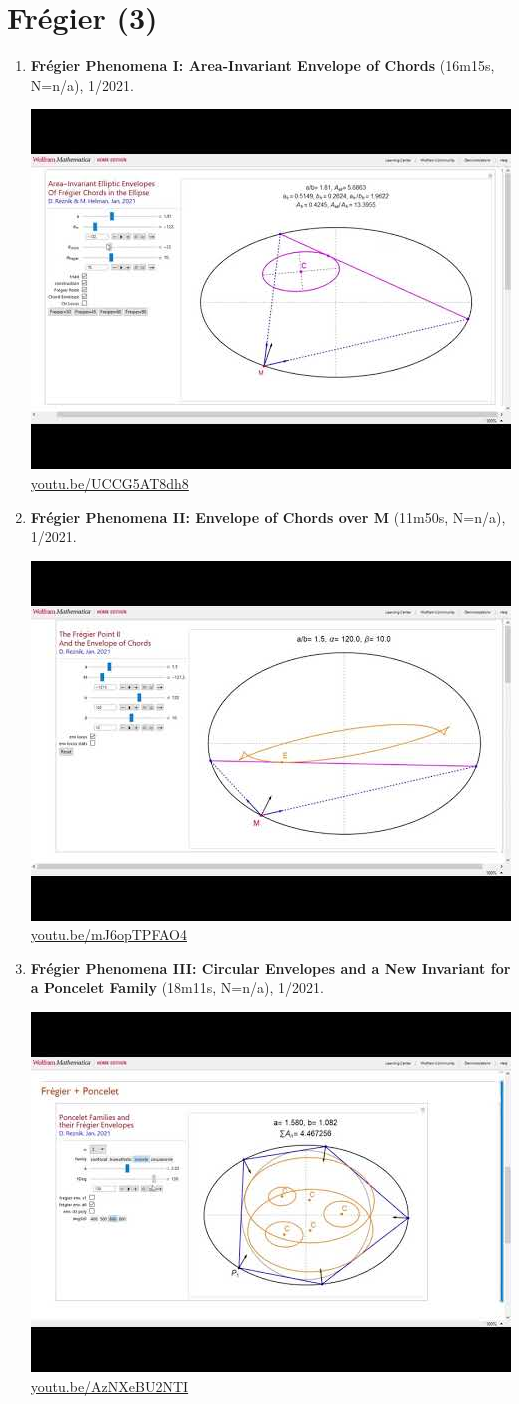 \documentclass[12pt]{amsart}
\begin{document}
\section{Frégier (3)}

\begin{enumerate}[resume]
\item \textbf{Frégier Phenomena I: Area-Invariant Envelope of Chords} (16m15s, N=n/a), 1/2021. 
\begin{center}\includegraphics[width=.5\textwidth]{pics/UCCG5AT8dh8.jpg} \\ 
\href{https://youtu.be/UCCG5AT8dh8}{\url{youtu.be/UCCG5AT8dh8}}\end{center}
% 
\item \textbf{Frégier Phenomena II: Envelope of Chords over M} (11m50s, N=n/a), 1/2021. 
\begin{center}\includegraphics[width=.5\textwidth]{pics/mJ6opTPFAO4.jpg} \\ 
\href{https://youtu.be/mJ6opTPFAO4}{\url{youtu.be/mJ6opTPFAO4}}\end{center}
% 
\item \textbf{Frégier Phenomena III: Circular Envelopes and a New Invariant for a Poncelet Family} (18m11s, N=n/a), 1/2021. 
\begin{center}\includegraphics[width=.5\textwidth]{pics/AzNXeBU2NTI.jpg} \\ 
\href{https://youtu.be/AzNXeBU2NTI}{\url{youtu.be/AzNXeBU2NTI}}\end{center}
% 
\end{enumerate}
\end{document}
